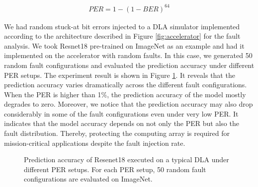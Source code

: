 \begin{small}
    \begin{equation}
        \label{eq:error_rate}
        \begin{aligned}
                PER = 1-(1-BER)^{64}
        \end{aligned}
    \end{equation}
    \vspace{-1em}
\end{small}

We had random stuck-at bit errors injected to a DLA simulator implemented according to the architecture described in Figure \ref{fig:accelerator} for the fault analysis. We took Resnet18 pre-trained on ImageNet \cite{deng2009imagenet} as an example and had it implemented on the accelerator with random faults. In this case, we generated 50 random fault configurations and evaluated the prediction accuracy under different PER setups. The experiment result is shown in Figure \ref{fig:bit}. It reveals that the prediction accuracy varies dramatically across the different fault configurations. When the PER is higher than 1\%, the prediction accuracy of the model mostly degrades to zero. Moreover, we notice that the prediction accuracy may also drop considerably in some of the fault configurations even under very low PER. It indicates that the model accuracy depends on not only the PER but also the fault distribution. Thereby, protecting the computing array is required for mission-critical applications despite the fault injection rate. 

\begin{figure}
    \setlength{\abovecaptionskip}{-1pt}
    \setlength{\belowcaptionskip}{0pt}
            \caption{Prediction accuracy of Resenet18 executed on a typical DLA under different PER setups. For each PER setup, 50 random fault configurations are evaluated on ImageNet.}
            \label{fig:bit}
\end{figure}

